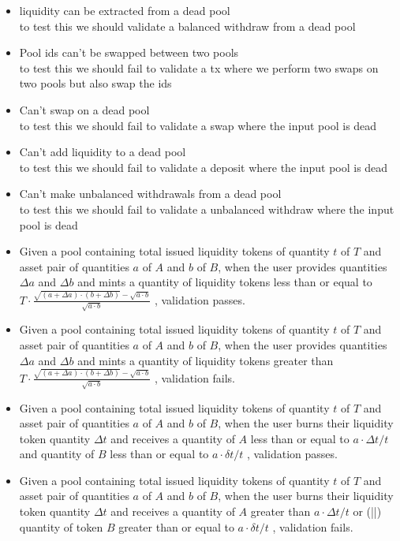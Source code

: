 \documentclass{article}
\begin{document}
\begin{itemize}
\begin{itemize}
			\end{itemize}
	\item liquidity can be extracted from a dead pool
		\\ to test this we should validate a balanced withdraw from a dead pool
	\item Pool ids can't be swapped between two pools
		\\ to test this we should fail to validate a tx where
		 we perform two swaps on two pools but also swap the ids
	\item Can't swap on a dead pool
		\\ to test this we should fail to validate a swap where the input pool is dead
	\item Can't add liquidity to a dead pool
		\\ to test this we should fail to validate a deposit where the input pool is dead
	\item Can't make unbalanced withdrawals from a dead pool
		\\ to test this we should fail to validate a unbalanced withdraw where the input pool is dead

	\item Given a pool containing total issued liquidity tokens of quantity $t$ of $T$ and asset
	      pair of quantities $a$ of $A$ and $b$ of $B$, when the user provides quantities $\Delta a$ and $\Delta b$
  	      and mints a quantity of liquidity tokens less than or equal to
	      $T \cdot \frac{\sqrt{ (a + \Delta a) \cdot (b + \Delta b)} - \sqrt{a \cdot b}}{\sqrt{a \cdot b}}$
	      , validation passes.
	\item Given a pool containing total issued liquidity tokens of quantity $t$ of $T$ and asset
	      pair of quantities $a$ of $A$ and $b$ of $B$, when the user provides quantities $\Delta a$ and $\Delta b$
	      and mints a quantity of liquidity tokens greater than
              $T \cdot \frac{\sqrt{ (a + \Delta a) \cdot (b + \Delta b)} - \sqrt{a \cdot b}}{\sqrt{a \cdot b}}$
	      , validation fails.
	\item Given a pool containing total issued liquidity tokens of quantity $t$ of $T$ and asset pair of quantities
	      $a$ of $A$ and $b$ of $B$, when the user burns
	      their liquidity token quantity $\Delta t$ and receives a quantity of $A$ less than or equal to
	      $ a \cdot \Delta t/t $ and quantity of $B$ less than or equal to $ a \cdot \delta t/t $
	      , validation passes.
	\item Given a pool containing total issued liquidity tokens of quantity $t$ of $T$ and asset
	      pair of quantities $a$ of $A$ and $b$ of $B$, when the user burns
	      their liquidity token quantity $\Delta t$ and receives a quantity of $A$ greater than
	      $ a \cdot \Delta t/t $ or (||) quantity of token $B$ greater than or equal to $ a \cdot \delta t/t $
	      , validation fails.
\end{itemize}
\end{document}
